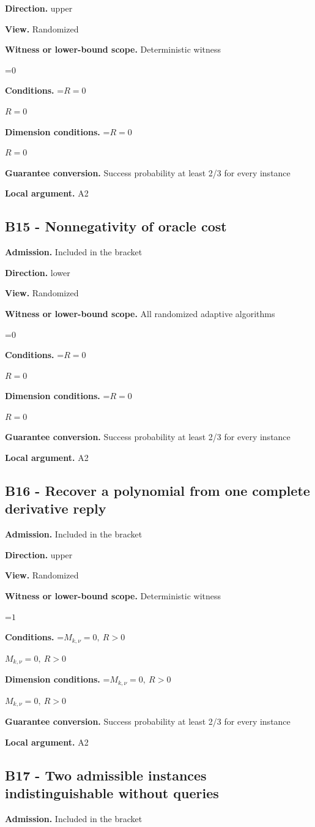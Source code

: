 \documentclass[10pt,a4paper]{article}
\newcommand{\AtlasMath}[1]{\par\begingroup\centering\setbox0=\hbox{$\displaystyle #1$}\ifdim\wd0>1.4\linewidth\typeout{ATLAS WIDE FORMULA: \the\wd0}\fi\ifdim\wd0>\linewidth\resizebox{\linewidth}{!}{\box0}\else\box0\fi\par\endgroup}
\newcommand{\AtlasInlineMath}[1]{\begingroup\setbox0=\hbox{$#1$}\ifdim\wd0>.4\linewidth\endgroup\AtlasMath{#1}\else\endgroup$#1$\fi}
\begin{document}
\textbf{Direction.} upper

\textbf{View.} Randomized

\textbf{Witness or lower-bound scope.} Deterministic witness

\AtlasMath{0}
\textbf{Conditions.} \AtlasInlineMath{R=0}

\textbf{Dimension conditions.} \AtlasInlineMath{R=0}

\textbf{Guarantee conversion.} Success probability at least 2/3 for every instance

\textbf{Local argument.} A2

\subsection{B15 - Nonnegativity of oracle cost}
\textbf{Admission.} Included in the bracket

\textbf{Direction.} lower

\textbf{View.} Randomized

\textbf{Witness or lower-bound scope.} All randomized adaptive algorithms

\AtlasMath{0}
\textbf{Conditions.} \AtlasInlineMath{R=0}

\textbf{Dimension conditions.} \AtlasInlineMath{R=0}

\textbf{Guarantee conversion.} Success probability at least 2/3 for every instance

\textbf{Local argument.} A2

\subsection{B16 - Recover a polynomial from one complete derivative reply}
\textbf{Admission.} Included in the bracket

\textbf{Direction.} upper

\textbf{View.} Randomized

\textbf{Witness or lower-bound scope.} Deterministic witness

\AtlasMath{1}
\textbf{Conditions.} \AtlasInlineMath{M_{k,\nu}=0,\ R>0}

\textbf{Dimension conditions.} \AtlasInlineMath{M_{k,\nu}=0,\ R>0}

\textbf{Guarantee conversion.} Success probability at least 2/3 for every instance

\textbf{Local argument.} A2

\subsection{B17 - Two admissible instances indistinguishable without queries}
\textbf{Admission.} Included in the bracket
\end{document}
